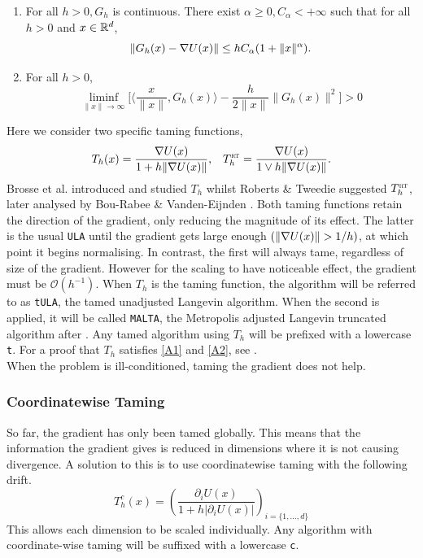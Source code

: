 \begin{enumerate}[label={\bf A{\arabic*}}]
	\item  For all \(h>0, G_h\) is continuous. There exist \(\alpha\geq 0, C_{\alpha}<+\infty\) such that for all \(h >0 \) and \(x \in \mathbb{R}^d\),
		\[\|G_h(x)-\nabla U(x)\| \leq hC_{\alpha}(1+\|x\|^{\alpha}).\]\label{A1}
	\item For all \(h>0\),
		\[ \liminf_{\|x\|\to \infty} \bigg\lbrack \bigg\langle \frac{x}{\|x\|}, G_h(x)\bigg\rangle - \frac{h}{2\|x\|}\|G_h(x)\|^2\bigg\rbrack >0\]\label{A2}
\end{enumerate}
Here we consider two specific taming functions,
 \begin{align*}
 T_h(x) = \frac{\nabla U(x)}{1+h\|\nabla U(x)\|}, &&  T^{\text{\sc \tiny RT}}_h = \frac{\nabla U(x)}{1\vee h\|\nabla U(x)\|}.
 \end{align*}
Brosse et al. introduced and studied \(T_h\) whilst Roberts \& Tweedie suggested \(T^{\text{\sc \tiny RT}}_h\), later analysed by Bou-Rabee \& Vanden-Eijnden \cite{BV10MALTA,Brosse18tULA,RT96}. Both taming functions retain the direction of the gradient, only reducing the magnitude of its effect. The latter is the usual \texttt{ULA} until the gradient gets large enough \((\|\grad U(x)\|> 1/h)\), at which point it begins normalising. In contrast, the first will always tame, regardless of size of the gradient. However for the scaling to have noticeable effect, the gradient must be \(\mathcal{O}(h^{-1})\).
When \(T_h\) is the taming function, the algorithm will be referred to as \texttt{tULA}, the tamed unadjusted Langevin algorithm. When the second is applied, it will be called \texttt{MALTA}, the Metropolis adjusted Langevin truncated algorithm after \cite{RT96}. Any tamed algorithm using \(T_h\) will be prefixed with a lowercase \texttt{t}. For a proof that \(T_h\) satisfies \ref{A1} and \ref{A2}, see \cite[Lemma~2]{Brosse18tULA}.
\\
When the problem is ill-conditioned, taming the gradient does not help. 
\subsubsection{Coordinatewise Taming}
So far, the gradient has only been tamed globally. This means that the information the gradient gives is reduced in dimensions where it is not causing divergence. A solution to this is to use coordinatewise taming with the following drift.
  \[T^c_{h}(x) =\left(\frac{\partial_i U(x)}{1+h|\partial_i U(x)|}\right)_{i=\lbrace 1, \dots, d\rbrace} \]
This allows each dimension to be scaled individually. Any algorithm with coordinate-wise taming will be suffixed with a lowercase \texttt{c}.

